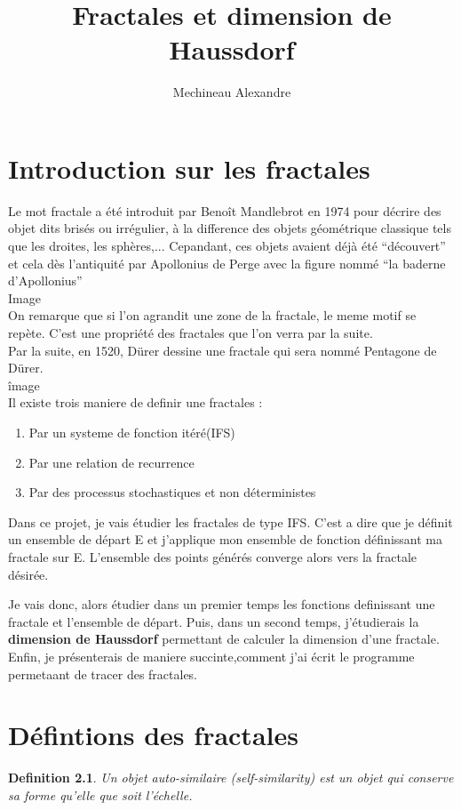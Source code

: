 \documentclass[a4paper, 12pt]{report}
\title{ \bf Fractales et dimension de Haussdorf}
\author{Mechineau Alexandre}
\begin{document}
\maketitle
\newtheorem{definition}{Definition}
\tableofcontents


\chapter{\bf Introduction sur les fractales}


Le mot fractale a été introduit par Benoît Mandlebrot en 1974 pour décrire des objet dits brisés ou irrégulier, à la difference des objets géométrique classique tels que les droites, les sphères,...
Cepandant, ces objets avaient déjà été ``découvert'' et cela dès l'antiquité par Apollonius de Perge avec la figure nommé ``la baderne d'Apollonius''\\
Image\\
On remarque que si l'on agrandit une zone de la fractale, le meme motif se repète. C'est une propriété des fractales que l'on verra par la suite.\\
Par la suite, en 1520, Dürer dessine une fractale qui sera nommé Pentagone de Dürer.\\
îmage\\

Il existe trois maniere de definir une fractales :
\begin{enumerate}\itemsep2pt
	\item Par un systeme de fonction itéré(IFS)
	\item Par  une relation de recurrence
	\item Par des processus stochastiques et non déterministes
\end{enumerate}

Dans ce projet, je vais étudier les fractales de type IFS. C'est a dire que  je définit un ensemble de départ E et j'applique mon ensemble de fonction définissant ma fractale sur E.
L'ensemble des points générés converge alors vers la fractale désirée.

Je vais donc, alors étudier dans un premier temps les fonctions definissant une fractale et l'ensemble de départ.
Puis, dans un second temps, j'étudierais la {\bf dimension de Haussdorf} permettant de calculer la dimension d'une fractale.
Enfin, je présenterais de maniere succinte,comment j'ai écrit le programme permetaant de tracer des fractales.

\chapter{\bf Défintions des fractales}
\begin{definition}
	Un objet auto-similaire (self-similarity) est un objet qui conserve sa forme qu'elle que soit l'échelle. 
\end{definition}
\end{document}
